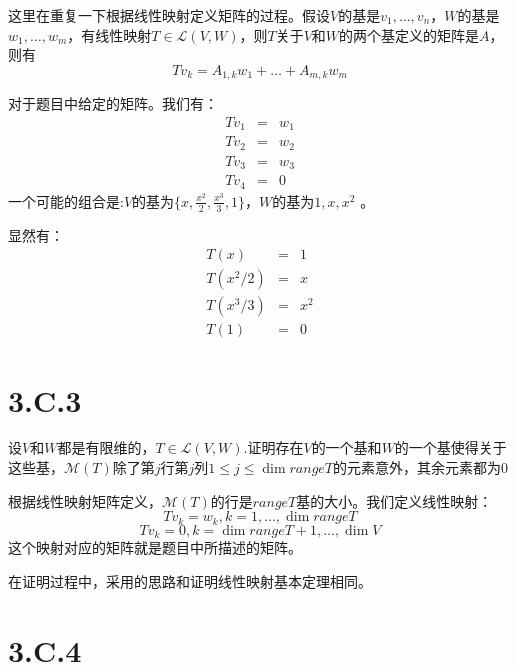 \documentclass[10pt,a4paper,UTF8]{article}
\begin{document}
\begin{answer}
这里在重复一下根据线性映射定义矩阵的过程。假设\(V\)的基是\(v_{1},\ldots ,v_{n}\)，\(W\)的基是\(w_{1},\ldots ,w_{m}\)，有线性映射\(T\in \mathcal{L}(V,W)\)，则\(T\)关于\(V\)和\(W\)的两个基定义的矩阵是\(A\)，则有
\begin{equation}
\label{eq:1}
Tv_{k} = A_{1,k}w_{1} + \ldots + A_{m,k}w_{m}
\end{equation}

对于题目中给定的矩阵。我们有：
\begin{eqnarray}
\label{eq:2}
Tv_{1}&=& w_{1} \\
Tv_{2}&=& w_{2} \\
Tv_{3}&=& w_{3} \\
Tv_{4}&=& 0
\end{eqnarray}
一个可能的组合是:\(V\)的基为\(\{x,\frac{x^{2}}{2},\frac{x^{3}}{3},1 \}\)，\(W\)的基为\(1,x,x^{2}\) 。

显然有：
\begin{eqnarray*}
T(x)&=& 1\\
T(x^{2}/2)&=& x\\
T(x^{3}/3)&=& x^{2}\\
T(1) &=& 0
\end{eqnarray*}
\end{answer}
\section{3.C.3}
\label{sec:org558579c}


\begin{problem}
设\(V\)和\(W\)都是有限维的，\(T\in \mathcal{L}(V,W)\).证明存在\(V\)的一个基和\(W\)的一个基使得关于这些基，\(\mathcal{M}(T)\)除了第\(j\)行第\(j\)列\(1\leq j \leq \dim range T\)的元素意外，其余元素都为\(0\)
\end{problem}

\begin{answer}
根据线性映射矩阵定义，\(\mathcal{M}(T)\)的行是\(rangeT\)基的大小。我们定义线性映射：
\begin{equation}
\label{eq:3}
Tv_{k} = w_{k},k =1,\ldots ,\dim range T
\end{equation}
\begin{equation}
\label{eq:4}
Tv_{k} = 0, k=\dim range T + 1 ,\ldots ,\dim V
\end{equation}
这个映射对应的矩阵就是题目中所描述的矩阵。

在证明过程中，采用的思路和证明线性映射基本定理相同。
\end{answer}
\section{3.C.4}
\label{sec:org76ae909}
\end{document}
